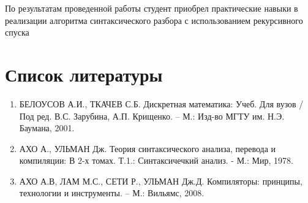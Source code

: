 	По результатам проведенной работы студент приобрел практические навыки в реализации алгоритма синтаксического разбора 
		с использованием рекурсивного спуска


	\section{Список литературы}
		\begin{enumerate}
			\item БЕЛОУСОВ А.И., ТКАЧЕВ С.Б. Дискретная математика: Учеб. Для вузов / Под ред. В.С. Зарубина, А.П. Крищенко. – М.: Изд-во МГТУ им. Н.Э. Баумана, 2001.
			\item АХО А., УЛЬМАН Дж. Теория синтаксического анализа, перевода и компиляции: В 2-х томах. Т.1.: Синтаксичечкий анализ. - М.: Мир, 1978.
			\item АХО А.В, ЛАМ М.С., СЕТИ Р., УЛЬМАН Дж.Д. Компиляторы: принципы, технологии и инструменты. – М.: Вильямс, 2008.
		\end{enumerate}
	